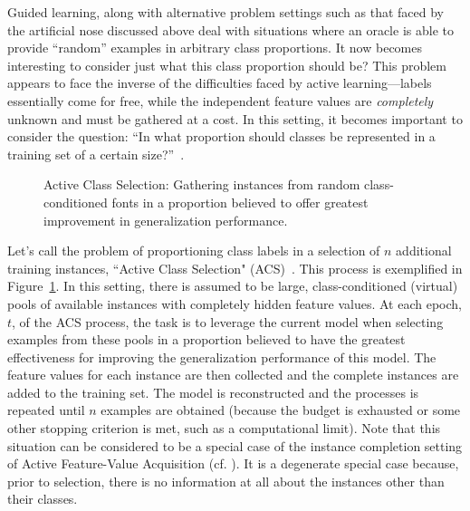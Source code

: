 Guided learning, along with alternative problem settings such as that faced by the artificial nose discussed above deal with situations where an oracle is able to provide ``random'' examples in arbitrary class proportions. It now becomes interesting to consider just what this class proportion should be? This problem appears to face the inverse of the difficulties faced by active learning---labels essentially come for free, while the independent feature values are \emph{completely} unknown and must be gathered at a cost. In this setting, it becomes important to consider the question: ``In what proportion should classes be represented in a training set of a certain size?''~\cite{WeissProvost2003}.

\begin{figure}[t!]
\begin{center}
\end{center}
\caption{Active Class Selection: Gathering instances from random class-conditioned fonts in a proportion believed to offer greatest improvement in generalization performance.}
\label{fig:acs}
\end{figure}


Let's call the problem of proportioning class labels in a selection of $n$ additional training instances, ``Active Class Selection" (ACS)~\cite{lomasky:ecml2007, lomaskyThesis, lomasky:nose2006,WeissProvost2003}. This process is exemplified in Figure~\ref{fig:acs}. In this setting, there is assumed to be large, class-conditioned (virtual) pools of available instances with completely hidden feature values. At each epoch, $t$, of the ACS process, the task is to leverage the current model when selecting examples from these pools in a proportion believed to have the greatest effectiveness for improving the generalization performance of this model. The feature values for each instance are then collected and the complete instances are added to the training set. The model is reconstructed and the processes is repeated until $n$ examples are obtained (because the budget is exhausted or some other stopping criterion is met, such as a computational limit). Note that this situation can be considered to be a special case of the instance completion setting of Active Feature-Value Acquisition (cf. \cite{icdm05:melville}).  It is a degenerate special case because, prior to selection, there is no information at all about the instances other than their classes.

